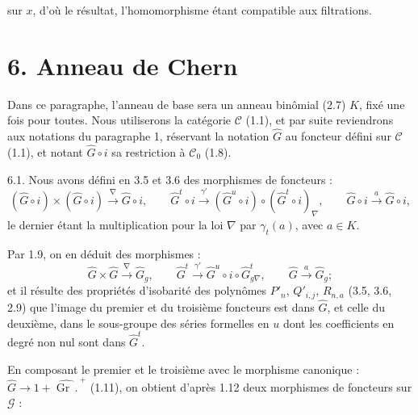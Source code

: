 
sur \(x\), d'où le
résultat, l'homomorphisme étant compatible aux filtrations.

\section*{6. Anneau de Chern}

Dans ce paragraphe, l'anneau de base sera un anneau binômial (2.7) \(K\), fixé une fois pour toutes. Nous utiliserons la catégorie \(\mathcal C\) (1.1), et par suite reviendrons aux notations du paragraphe 1, réservant la notation \(\widehat G\) au foncteur défini sur \(\mathcal C\) (1.1), et notant \(\widehat G\circ i\) sa restriction à \(\mathcal C_0\) (1.8).

6.1. Nous avons défini en 3.5 et 3.6 des morphismes de foncteurs :
\[
  (\widehat G\circ i)\times(\widehat G\circ i)\xrightarrow{\nabla}\widehat G\circ i,
  \qquad
  \widehat G^t\circ i\xrightarrow{\gamma'}(\widehat G^u\circ i)\circ(\widehat G^t\circ i)_\nabla,
  \qquad
  \widehat G\circ i\xrightarrow{a}\widehat G\circ i,
\]
le dernier étant la multiplication pour la loi \(\nabla\) par \(\gamma_t(a)\), avec \(a\in K\).

Par 1.9, on en déduit des morphismes :
\[
  \widehat G\times\widehat G\xrightarrow{\nabla}\widehat G_g,
  \qquad
  \widehat G^t\xrightarrow{\gamma'}\widehat G^u\circ i\circ\widehat G^t_{g\nabla},
  \qquad
  \widehat G\xrightarrow{a}\widehat G_g;
\]
et il résulte des propriétés d'isobarité des polynômes \(P'_n\), \(Q'_{i,j}\), \(R_{n,a}\) (3.5, 3.6, 2.9) que l'image du premier et du troisième foncteurs est dans \(\widehat G\), et celle du deuxième, dans le sous-groupe des séries formelles en \(u\) dont les coefficients en degré non nul sont dans \(\widehat G^t\).

En composant le premier et le troisième avec le morphisme canonique : \(\widehat G\longrightarrow 1+\widehat{\operatorname{Gr}\,\mathord{.}\,}^{+}\) (1.11), on obtient d'après 1.12 deux morphismes de
foncteurs sur \(\mathcal G\) :

